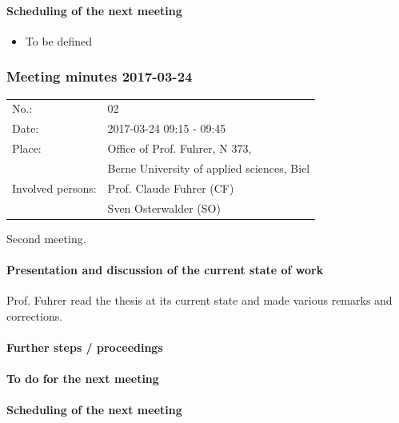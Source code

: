 \documentclass[10pt, openright, notitlepage]{scrreprt}
\begin{document}
\paragraph{Scheduling of the next meeting}
\label{sec:org324e7db}

\begin{itemize}
\item To be defined
\end{itemize}
\subsubsection{Meeting minutes 2017-03-24}
\label{sec:org22eb13e}

\begin{center}
\begin{tabular}{ll}
No.: & 02\\
Date: & 2017-03-24 09:15 - 09:45\\
Place: & Office of Prof. Fuhrer, N 373,\\
 & Berne University of applied sciences, Biel\\
Involved persons: & Prof. Claude Fuhrer (CF)\\
 & Sven Osterwalder (SO)\\
\end{tabular}
\end{center}

Second meeting.

\paragraph{Presentation and discussion of the current state of work}
\label{sec:orge924335}

Prof. Fuhrer read the thesis at its current state and made various remarks and
corrections.

\paragraph{Further steps / proceedings}
\label{sec:org78cd703}

\paragraph{To do for the next meeting}
\label{sec:org148b771}

\paragraph{Scheduling of the next meeting}
\label{sec:orga78451e}
\end{document}

